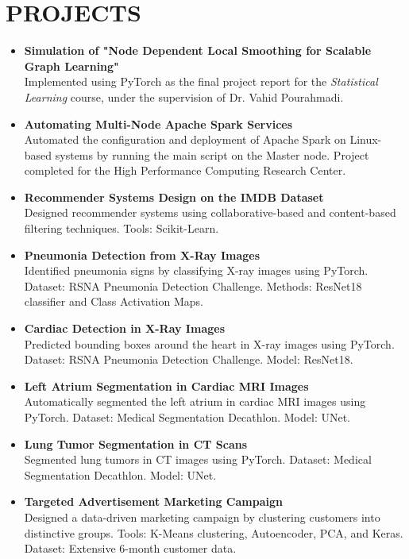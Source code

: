 \documentclass[11pt,a4paper,sans]{moderncv} %
\begin{document}
\section{PROJECTS}
\vspace{0.3em}
\begin{itemize}
    \item \textbf{Simulation of "Node Dependent Local Smoothing for Scalable Graph Learning"} \\ 
    Implemented using PyTorch as the final project report for the \emph{Statistical Learning} course, under the supervision of Dr. Vahid Pourahmadi.

    \item \textbf{Automating Multi-Node Apache Spark Services} \\ 
    Automated the configuration and deployment of Apache Spark on Linux-based systems by running the main script on the Master node. Project completed for the High Performance Computing Research Center.

    \item \textbf{Recommender Systems Design on the IMDB Dataset} \\ 
    Designed recommender systems using collaborative-based and content-based filtering techniques. Tools: Scikit-Learn.

    \item \textbf{Pneumonia Detection from X-Ray Images} \\ 
    Identified pneumonia signs by classifying X-ray images using PyTorch. Dataset: RSNA Pneumonia Detection Challenge. Methods: ResNet18 classifier and Class Activation Maps.

    \item \textbf{Cardiac Detection in X-Ray Images} \\ 
    Predicted bounding boxes around the heart in X-ray images using PyTorch. Dataset: RSNA Pneumonia Detection Challenge. Model: ResNet18.

    \item \textbf{Left Atrium Segmentation in Cardiac MRI Images} \\ 
    Automatically segmented the left atrium in cardiac MRI images using PyTorch. Dataset: Medical Segmentation Decathlon. Model: UNet.

    \item \textbf{Lung Tumor Segmentation in CT Scans} \\ 
    Segmented lung tumors in CT images using PyTorch. Dataset: Medical Segmentation Decathlon. Model: UNet.

    \item \textbf{Targeted Advertisement Marketing Campaign} \\ 
    Designed a data-driven marketing campaign by clustering customers into distinctive groups. Tools: K-Means clustering, Autoencoder, PCA, and Keras. Dataset: Extensive 6-month customer data.
\end{itemize}
\end{document}
